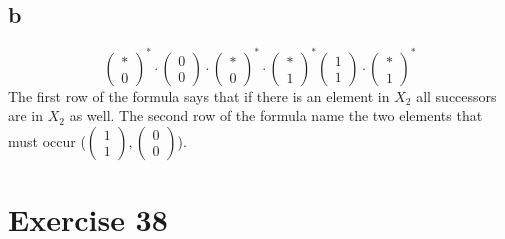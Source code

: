\documentclass[10pt]{article}
\begin{document}
    \subsection*{b}
      \begin{displaymath}
        \left(
          \begin{array}{c}
            * \\
            0
          \end{array}
        \right)^{*} \cdot
        \left(
          \begin{array}{c}
            0 \\
            0
          \end{array}
        \right) \cdot
        \left(
          \begin{array}{c}
            * \\
            0
          \end{array}
        \right)^{*} \cdot
        \left(
          \begin{array}{c}
            * \\
            1
          \end{array}
        \right)^{*}
        \left(
          \begin{array}{c}
            1 \\
            1
          \end{array}
        \right) \cdot
        \left(
          \begin{array}{c}
            * \\
            1
          \end{array}
        \right)^{*}
      \end{displaymath}
      The first row of the formula says that if there is an element in $X_{2}$
      all successors are in $X_{2}$ as well. The second row of the formula name
      the two elements that must occur ($
        \left(
          \begin{array}{c}
            1 \\
            1
          \end{array}
        \right),
        \left(
          \begin{array}{c}
            0 \\
            0
          \end{array}
        \right)$).

  \section*{Exercise 38}
\end{document}
